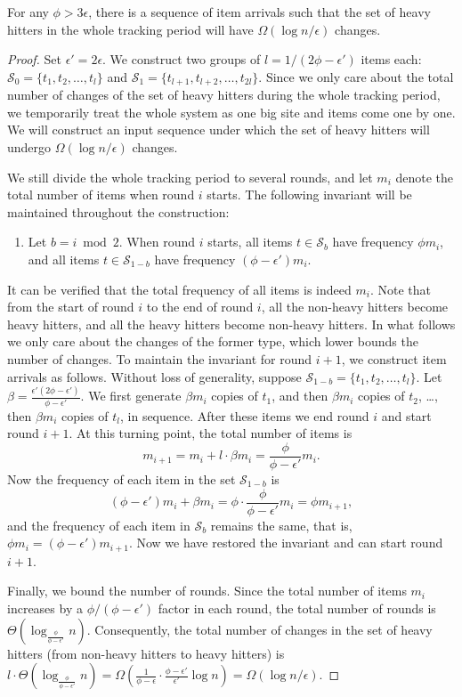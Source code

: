 \documentclass[10pt]{article}
\newcommand{\eps}{\epsilon}
\begin{document}
\begin{lemma}
\label{lem:numberOfOutputUpdates} For any $\phi>3\eps$, there is a
sequence of item arrivals such that the set of heavy hitters in
the whole tracking period will have $\Omega(\log n / \epsilon)$
changes.
\end{lemma}

\begin{proof}
  Set $\eps'=2\eps$. We construct two groups of $l= 1/(2\phi - \epsilon')$
  items each: $\mathcal{S}_0=\{t_1, t_2, \ldots, t_l\}$ and
  $\mathcal{S}_1=\{t_{l+1}, t_{l+2}, \ldots, t_{2l}\}$. Since we only care
  about the total number of changes of the set of heavy hitters during the
  whole tracking period, we temporarily treat the whole system as one big
  site and items come one by one. We will construct an input sequence under
  which the set of heavy hitters will undergo $\Omega(\log n /
  \epsilon)$ changes.

We still divide the whole tracking period to several rounds, and
let $m_i$ denote the total number of items when round $i$ starts.
The following invariant will be maintained throughout the
construction:
\begin{enumerate}
\item[] Let $b = i \bmod 2$.  When round $i$ starts, all items $t
\in \mathcal{S}_{b}$ have frequency $\phi m_i$, and all items $t
\in \mathcal{S}_{1-b}$ have frequency $(\phi-\epsilon') m_i$.
\end{enumerate}
It can be verified that the total frequency of all items is indeed
$m_i$. Note that from the start of round $i$ to the end of round
$i$, all the non-heavy hitters become heavy hitters, and all the
heavy hitters become non-heavy hitters. In what follows we only
care about the changes of the former type, which lower bounds
the number of changes. To maintain the
invariant for round $i+1$, we construct item arrivals as follows.
Without loss of generality, suppose $\mathcal{S}_{1-b} = \{t_1,
t_2, \ldots, t_l\}$. Let $\beta = \frac{\epsilon'(2\phi -
\epsilon')}{\phi - \epsilon'}$. We first generate
 $\beta m_i$ copies of $t_1$, and then $\beta m_i$
copies of $t_2$, \dots, then $\beta m_i$ copies of $t_l$, in sequence.
After these items we end round $i$ and start round
$i+1$. At this turning point, the total number of items is
$$m_{i+1} = m_i + l\cdot \beta m_i = \frac{\phi}{\phi-\epsilon'} m_i.$$
Now the frequency of each item in the set $\mathcal{S}_{1-b}$ is
$$(\phi - \epsilon')m_i + \beta m_i = \phi \cdot \frac{\phi}{\phi -
  \epsilon'} m_i = \phi m_{i+1},$$
and the frequency of each item in $\mathcal{S}_{b}$ remains the
same, that is, $\phi m_i = (\phi - \epsilon') m_{i+1}$.  Now we have
  restored the invariant and can start round $i+1$.

Finally, we bound the number of rounds.  Since the total number of
items $m_i$ increases by a $\phi/(\phi-\eps')$ factor in each
round, the total number of rounds is
$\Theta(\log_{\frac{\phi}{\phi-\epsilon'}}n)$. Consequently, the
total number of changes in the set of heavy hitters (from
non-heavy hitters to heavy hitters) is $l \cdot
\Theta(\log_{\frac{\phi}{\phi-\epsilon'}}n) =
\Omega(\frac{1}{\phi-\eps} \cdot \frac{\phi-\eps'}{\eps'} \log n)
= \Omega(\log n/ \epsilon)$.
\end{proof}
\end{document}
